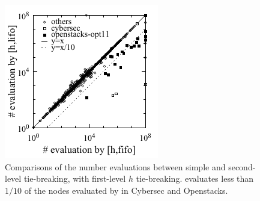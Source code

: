 \begin{table}[tb]
 \centering
  \setlength{\tabcolsep}{0.3em}
 
 \caption{Experiments comparing the coverages.
 Each cell shows the coverage of the domain solved with 5 min, 2GB.
 Zerocost domains are named as [original name]-[name of nonzero action].
 Due to space, we do not show
 the individual rows for the following domains whose maximum coverage differences
 (in randomized configuration, mean coverage of 10 runs)
 do not exceed 2. These include
 (1) domains with coverage difference 0 (same coverages by all configuration):
 .
 (2) Coverage difference below 1:
 .
 (3) Coverage difference below 2:
 .
 Full results are in the supplemental material.
}  \label{depth}
\end{table}

\begin{figure}[tb]
 \centering {}
 \includegraphics{tables/aaai16-30min-5min-cut/aaai16prelim3/evaluated-lmcut_ff-lmcut_lf.pdf}
 \caption{Comparisons of the number evaluations between simple \lifo and
 \fifo second-level tie-breaking, with first-level $h$
 tie-breaking. \lifo evaluates less than $1/10$ of the nodes evaluated
 by \fifo in Cybersec and Openstacks.}
 \label{f-h-eval}
\end{figure}


